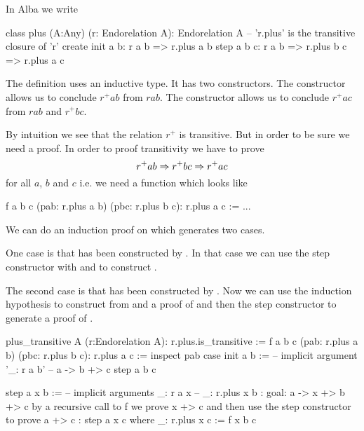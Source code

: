 In Alba we write

\begin{alba}
  class
    plus (A:Any) (r: Endorelation A): Endorelation A
      -- 'r.plus' is the transitive closure of 'r'
  create
    init a b:
      r a b
      => r.plus a b
    step a b c:
      r a b
      => r.plus b c
      => r.plus a c
\end{alba}

The definition uses an inductive type. It has two constructors. The
 constructor allows us to conclude $r^+ a b$ from $r a b$.  The
 constructor allows us to conclude $r^+ a c$ from $r a b$ and $r^+
b c$.

By intuition we see that the relation $r^+$ is transitive. But in
order to be sure we need a proof. In order to proof transitivity we have to
prove
%
$$
 r^+ a b \Rightarrow r^+ b c \Rightarrow r^+ a c
$$
%
for all $a$, $b$ and $c$
i.e. we need a function which looks like
%
\begin{alba}
  f a b c (pab: r.plus a b) (pbc: r.plus b c): r.plus a c :=
    ...
\end{alba}
%
We can do an induction proof on  which generates two
cases.

One case is that  has been constructed
by . In that case we can use the step constructor with
 and  to construct .

The second case is that   has been constructed by . Now we can use the induction
hypothesis to construct from  and  a proof of  and then the step constructor to generate a proof of .


\begin{alba}
  plus_transitive A (r:Endorelation A): r.plus.is_transitive :=
    f a b c (pab: r.plus a b) (pbc: r.plus b c): r.plus a c :=
      inspect
        pab
      case
        init a b :=   -- implicit argument '_: r a b'
            -- a -> b +> c
          step a b c

        step a x b :=
            -- implicit arguments _:  r a x
            --                    _: r.plus x b
            {: goal: a -> x +> b +> c
               by a recursive call to f we prove x +> c
               and then use the step constructor to prove a +> c :}
          step a x c
          where
             _: r.plus x c := f x b c
\end{alba}




